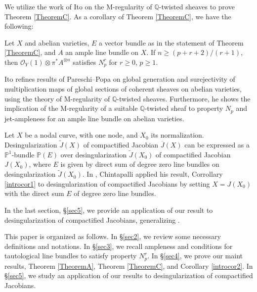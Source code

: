 \documentclass[11pt,letter]{amsart}
\newcommand\sti[1]{\todo[inline,color=magenta]{#1}}%
\newcommand\mji[1]{\todo[inline,color=yellow]{#1}}%
\numberwithin{equation}{section}
\begin{document}
We utilize the work of Ito \cite{Ito22} on the M-regularity of $\mathbb{Q}$-twisted sheaves to prove Theorem \ref{TheoremC}.
As a corollary of Theorem \ref{TheoremC}, we have the following:
\begin{introcor}\label{introcor2}
  Let $X$ and abelian varieties, $E$ a vector bundle as in the statement of Theorem \ref{TheoremC}, and $A$ an ample line bundle on $X$. If $n\geq (p+r+2)/(r+1)$, then $\mathcal{O}_Y(1)\otimes\pi^* A^{\otimes n}$ satisfies $N_p^r$ for $r\geq 0$, $p\geq 1$.
  \end{introcor}
  
 Ito \cite{Ito22} refines results of Pareschi--Popa \cite{PP03,PP11} on global generation and surejectivity of multiplication maps of global sections of coherent sheaves on abelian varieties, using the theory of M-regularity of $\mathbb{Q}$-twisted sheaves. Furthermore, he shows the implication of the M-regularity of a suitable $\mathbb{Q}$-twisted sheaf to property $N_p$ and jet-ampleness for an ample line bundle on abelian varieties. 

  
  
 Let $X$ be a nodal curve, with one node, and $X_0$ its normalization. Desingularization $\widetilde{J}(X)$ of compactified Jacobian $\overline{J}(X)$ can be expressed as a $\mathbb{P}^1$-bundle $\mathbb{P}(E)$ over desingularization $\widetilde{J}(X_0)$ of compactified Jacobian $J(X_0)$, where $E$ is given by direct sum of degree zero line bundles on desingularization $\widetilde{J}(X_0)$. In \cite[Theorem 5.4]{Chi19}, Chintapalli applied his result, Corrollary \ref{introcor1} to desingularization of compactified Jacobians by setting $X=J(X_0)$ with the direct sum $E$ of degree zero line bundles.
 
  In the last section, \S\ref{sec5}, we provide an application of our result to desingularization of compactified Jacobians, generalizing \cite[Theorem 5.4]{Chi19}. 
  
  
  
  
  
  This paper is organized as follows. In \S\ref{sec2}, we review some necessary definitions and notations. In \S\ref{sec3}, we recall ampleness and conditions for tautological line bundles to satisfy property $N_p^r$. In \S\ref{sec4}, we prove our maint results, Theorem \ref{TheoremA}, Theorem \ref{TheoremC}, and Corollary \ref{introcor2}. In \S\ref{sec5}, we study an application of our results to desingularization of compactified Jacobians.
\end{document}
